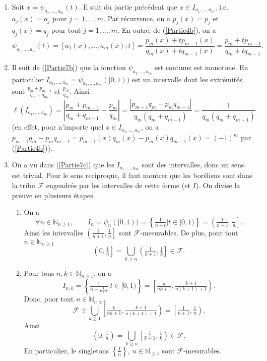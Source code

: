 \documentclass[french]{article}
\theoremstyle{definition}
\newcommand{\set}[1]{\left\{#1\right\}}
\newcommand{\oin}[1]{\left(#1\right)}
\newcommand{\olin}[1]{\left(#1\right]}
\newcommand{\orin}[1]{\left[#1\right)}
\newcommand{\abs}[1]{\left|#1\right|}
\newcommand{\Nbb}{\mathbb{N}}
\newcommand{\Fcal}{\mathcal{F}}
\begin{document}
\begin{enumerate}
\begin{enumerate}
            \item \label{Partie7b}
                Soit $x = \psi_{a_1,\ldots,a_m}(t)$. Il suit du partie pr\'ec\'edent que $x \in I_{a_1,\ldots,a_m}$, i.e. $a_j(x) = a_j$ pour $j=1,\ldots,m$. Par r\'ecurrence, on a $p_j(x) = p_j$ et $q_j(x) = q_j$ pour tout $j = 1,\ldots,m$. En outre, de (\ref{Partie4b}), on a
                    $$\psi_{a_1,\ldots,a_m}(t) = [a_1(x),\ldots,a_m(x);t] = \frac{p_m(x) + tp_{m-1}(x)}{q_m(x) + tq_{m-1}(x)} = \frac{p_m + tp_{m-1}}{q_m + tq_{m-1}}.$$
            \item \label{Partie7c}
                Il suit de (\ref{Partie7b}) que la fonction $\psi_{a_1,\ldots,a_m}$ est continue est monotone. En particulier $I_{a_1,\ldots,a_m} = \psi_{a_1,\ldots,a_m}([0,1))$ est un intervalle dont les extr\'emit\'es sont $\frac{p_m + p_{m-1}}{q_m + q_{m_1}}$ et $\frac{p_m}{q_m}$. Ainsi
                    $$\ell(I_{a_1,\ldots,a_m}) = \abs{\frac{p_m + p_{m-1}}{q_m + q_{m-1}} - \frac{p_m}{q_m}} = \frac{\abs{p_{m-1}q_m - p_m q_{m-1}}}{q_m(q_m + q_{m-1})} = \frac{1}{q_m(q_m + q_{m-1})}$$
                (en effet, pour n'importe quel $x \in I_{a_1,\ldots,a_m}$, on a $p_{m-1}q_m - p_mq_{m-1} = p_{m-1}(x)q_m(x) - p_m(x)q_{m-1}(x) = (-1)^m$ par (\ref{Partie4b})).
                
            \item \label{Partie7d} On a vu dans (\ref{Partie7c}) que les $I_{a_1,\ldots,a_m}$ sont des intervalles, donc un sens est trivial. Pour le sens reciproque, il faut montrer que les bor\'eliens sont dans la tribu $\Fcal$ engendr\'ee par les intervalles de cette forme (et $I$). On divise la preuve en plusieurs \'etapes.
            \begin{enumerate}
                \item On a $$\forall n \in \Nbb_{n \ge 1}, \qquad I_n = \psi_n([0,1)) = \set{\tfrac{1}{n+t} | t \in [0,1)} = \olin{\tfrac{1}{n+1},\tfrac{1}{n}}.$$
                Ainsi les intervalles $\olin{\tfrac{1}{n+1},\tfrac{1}{n}}$ sont $\Fcal$-mesurables. De plus, pour tout $n \in \Nbb_{n \ge 1}$
                    $$\olin{0,\tfrac{1}{n}} = \bigcup_{k \ge n} \olin{\tfrac{1}{k+1},\tfrac{1}{k}} \in \Fcal.$$
                    
                \item Pour tous $n, k \in \Nbb_{n \ge 1}$, on a
                    $$I_{n,k} = \set{\tfrac{1}{n + \frac{1}{k+t}} | t \in [0,1)} = \orin{\tfrac{k}{nk+1}, \tfrac{k+1}{n(k+1)+1}}.$$
                Donc, puor tout $n \in \Nbb_{n \ge 1}$
                    $$\Fcal \owns \bigcup_{k \ge 1}  \orin{\tfrac{k}{nk+1}, \tfrac{k+1}{n(k+1)+1}} = \orin{\tfrac{1}{n+1},\tfrac{1}{n}}.$$
                Ainsi
                    $$\oin{0,\tfrac{1}{n}} = \bigcup_{k \ge n} \orin{\tfrac{1}{k+1},\tfrac{1}{k}} \in \Fcal.$$
                En particulier, le singletons $\set{\tfrac{1}{n}}$, $n \in \Nbb_{\ge 1}$ sont $\Fcal$-mesurables.
                

\end{enumerate}
\end{enumerate}
\end{enumerate}
\end{document}
